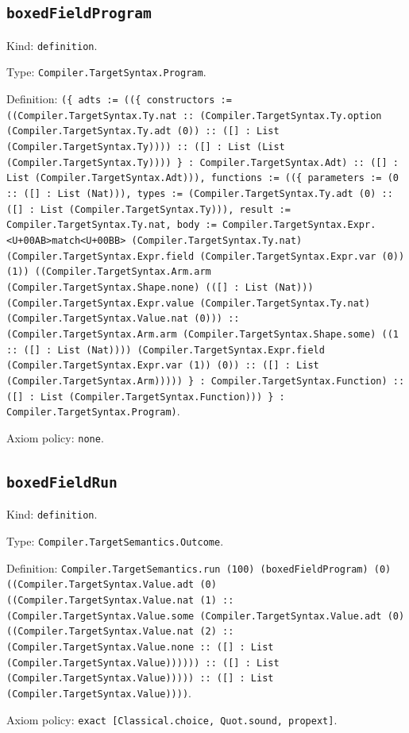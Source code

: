 \documentclass[11pt]{article}
\begin{document}
\subsection*{\texttt{boxedFieldProgram}}
\noindent Kind: \texttt{definition}.\par
\noindent Type: \texttt{Compiler.TargetSyntax.Program}.\par
\noindent Definition: \texttt{(\{ adts := ((\{ constructors := ((Compiler.TargetSyntax.Ty.nat :: (Compiler.TargetSyntax.Ty.option (Compiler.TargetSyntax.Ty.adt (0)) :: ([] : List (Compiler.TargetSyntax.Ty)))) :: ([] : List (List (Compiler.TargetSyntax.Ty)))) \} : Compiler.TargetSyntax.Adt) :: ([] : List (Compiler.TargetSyntax.Adt))), functions := ((\{ parameters := (0 :: ([] : List (Nat))), types := (Compiler.TargetSyntax.Ty.adt (0) :: ([] : List (Compiler.TargetSyntax.Ty))), result := Compiler.TargetSyntax.Ty.nat, body := Compiler.TargetSyntax.Expr.<U+00AB>match<U+00BB> (Compiler.TargetSyntax.Ty.nat) (Compiler.TargetSyntax.Expr.field (Compiler.TargetSyntax.Expr.var (0)) (1)) ((Compiler.TargetSyntax.Arm.arm (Compiler.TargetSyntax.Shape.none) (([] : List (Nat))) (Compiler.TargetSyntax.Expr.value (Compiler.TargetSyntax.Ty.nat) (Compiler.TargetSyntax.Value.nat (0))) :: (Compiler.TargetSyntax.Arm.arm (Compiler.TargetSyntax.Shape.some) ((1 :: ([] : List (Nat)))) (Compiler.TargetSyntax.Expr.field (Compiler.TargetSyntax.Expr.var (1)) (0)) :: ([] : List (Compiler.TargetSyntax.Arm))))) \} : Compiler.TargetSyntax.Function) :: ([] : List (Compiler.TargetSyntax.Function))) \} : Compiler.TargetSyntax.Program)}.\par
\noindent Axiom policy: \texttt{none}.\par
\subsection*{\texttt{boxedFieldRun}}
\noindent Kind: \texttt{definition}.\par
\noindent Type: \texttt{Compiler.TargetSemantics.Outcome}.\par
\noindent Definition: \texttt{Compiler.TargetSemantics.run (100) (boxedFieldProgram) (0) ((Compiler.TargetSyntax.Value.adt (0) ((Compiler.TargetSyntax.Value.nat (1) :: (Compiler.TargetSyntax.Value.some (Compiler.TargetSyntax.Value.adt (0) ((Compiler.TargetSyntax.Value.nat (2) :: (Compiler.TargetSyntax.Value.none :: ([] : List (Compiler.TargetSyntax.Value)))))) :: ([] : List (Compiler.TargetSyntax.Value))))) :: ([] : List (Compiler.TargetSyntax.Value))))}.\par
\noindent Axiom policy: \texttt{exact [Classical.choice, Quot.sound, propext]}.\par
\end{document}
